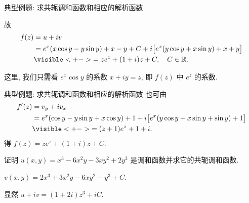 \begin{frame}{典型例题: 求共轭调和函数和相应的解析函数}
	\onslide<+->
	\begin{solutionc}
		故
		\vspace{-.5\baselineskip}
		\begin{align*}
			f(z)&=u+iv\\
			&=e^x(x\cos y-y\sin y)+x-y+C
			+i\bigl[e^x(y\cos y+x\sin y)+x+y\bigr]\\
			&\visible<+->{=ze^z+(1+i)z+C,\quad C\in\BR.}
		\end{align*}
	\end{solutionc}
	\onslide<+->
	这里, 我们只需看 $e^x\cos y$ 的系数 $x+iy=z$, 即 $f(z)$ 中 $e^z$ 的系数.
\end{frame}


\begin{frame}{典型例题: 求共轭调和函数和相应的解析函数}
	\onslide<+->
	也可由
	\begin{align*}
		f'(z)&=v_y+iv_x\\
		&=e^x(\cos y-y\sin y+x\cos y)+1
		+i\bigl[e^x(y\cos y+x\sin y+\sin y)+1\bigr]\\
		&\visible<+->{=(z+1)e^z+1+i.}
	\end{align*}
	\onslide<+->
	得 $f(z)=ze^z+(1+i)z+C$.
	\onslide<+->
	\begin{exercise}
		证明 $u(x,y)=x^3-6x^2y-3xy^2+2y^3$ 是调和函数并求它的共轭调和函数.
	\end{exercise}

	\onslide<+->
	\begin{answer}
		$v(x,y)=2x^3+3x^2y-6xy^2-y^3+C$.
	\end{answer}
	\onslide<+->
	显然 $u+iv=(1+2i)z^3+iC$.
\end{frame}

